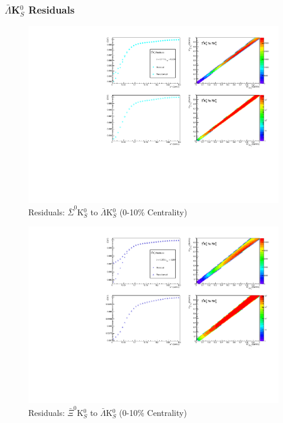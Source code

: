\documentclass[../AnalysisNoteJBuxton.tex]{subfiles}
\begin{document}
\subsubsection{\texorpdfstring{$\bar{\Lambda}$K$^{0}_{S}$}{TEXT} Residuals}
\label{Residuals_ALamK0}

\begin{figure}[h]
  \centering
  \includegraphics[width=\textwidth]{9_AdditionalFigures/Figures/Residuals/ALamK0/Residuals_ALamK0_0010_ASig0K0_MomResCrctn_NonFlatBgdCrctn_SingleLamParam_ResidualsIncluded_UsingCoulombOnlyInterpCfs.pdf}
  \caption[Residuals: $\bar{\Sigma}^{0}$K$^{0}_{S}$ to $\bar{\Lambda}$K$^{0}_{S}$ (0-10\% Centrality)]{Residuals: $\bar{\Sigma}^{0}$K$^{0}_{S}$ to $\bar{\Lambda}$K$^{0}_{S}$ (0-10\% Centrality)}
  \label{fig:Res_ALamK0_0010_ASig0K0}
\end{figure}


\begin{figure}[h]
  \centering
  \includegraphics[width=\textwidth]{9_AdditionalFigures/Figures/Residuals/ALamK0/Residuals_ALamK0_0010_AXi0K0_MomResCrctn_NonFlatBgdCrctn_SingleLamParam_ResidualsIncluded_UsingCoulombOnlyInterpCfs.pdf}
  \caption[Residuals: $\bar{\Xi}^{0}$K$^{0}_{S}$ to $\bar{\Lambda}$K$^{0}_{S}$ (0-10\% Centrality)]{Residuals: $\bar{\Xi}^{0}$K$^{0}_{S}$ to $\bar{\Lambda}$K$^{0}_{S}$ (0-10\% Centrality)}
  \label{fig:Res_ALamK0_0010_AXi0K0}
\end{figure}
\end{document}
